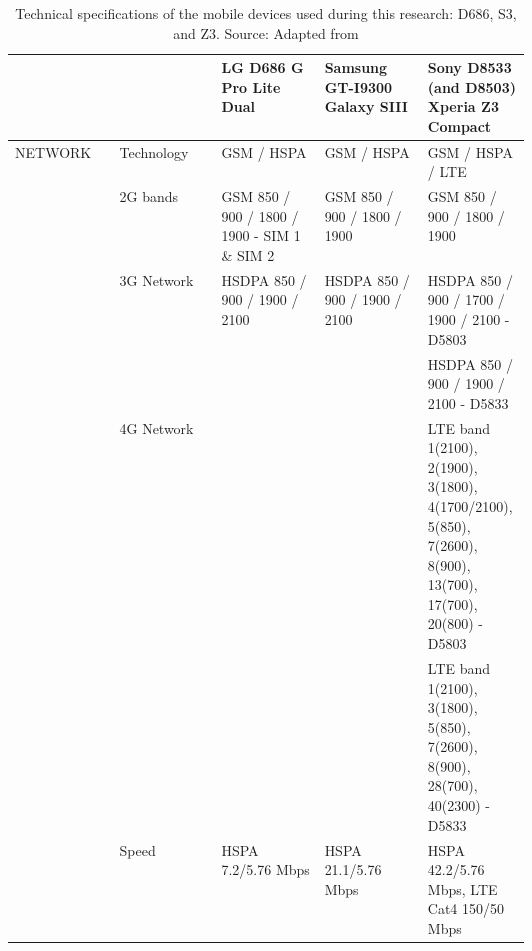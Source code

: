 \begin{longtable}{llp{0.2\linewidth}p{0.2\linewidth}p{0.2\linewidth}}
	\caption{Technical specifications of the mobile devices used during this research: D686, S3, and Z3. Source: Adapted from \cite{GSMARENA2017-lg-s3-z3}} \\ \hline
		&               & LG D686 G Pro Lite Dual                              & Samsung GT-I9300 Galaxy SIII                                                                  & Sony D8533 (and D8503) Xperia Z3 Compact                                                                                         \\ \hline \endhead
		NETWORK  & Technology    & GSM / HSPA                                      & GSM / HSPA                                                                                  & GSM / HSPA / LTE                                                                                               \\
		& 2G bands      & GSM 850 / 900 / 1800 / 1900 - SIM 1 \& SIM 2    & GSM 850 / 900 / 1800 / 1900                                                                 & GSM 850 / 900 / 1800 / 1900                                                                                    \\
		& 3G Network    & HSDPA 850 / 900 / 1900 / 2100                   & HSDPA 850 / 900 / 1900 / 2100                                                               & HSDPA 850 / 900 / 1700 / 1900 / 2100 - D5803                                                                   \\
		&               &                                                 &                                                                                             & HSDPA 850 / 900 / 1900 / 2100 - D5833                                                                          \\
		& 4G Network    &                                                 &                                                                                             & LTE band 1(2100), 2(1900), 3(1800), 4(1700/2100), 5(850), 7(2600), 8(900), 13(700), 17(700), 20(800) - D5803   \\
		&               &                                                 &                                                                                             & LTE band 1(2100), 3(1800), 5(850), 7(2600), 8(900), 28(700), 40(2300) - D5833                                  \\
		& Speed         & HSPA 7.2/5.76 Mbps                              & HSPA 21.1/5.76 Mbps                                                                         & HSPA 42.2/5.76 Mbps, LTE Cat4 150/50 Mbps                                                                      \\

\end{longtable}
